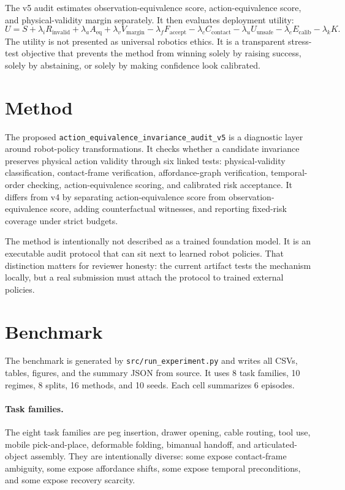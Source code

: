 \documentclass{article}
\begin{document}
The v5 audit estimates observation-equivalence score, action-equivalence score, and physical-validity margin separately. It then evaluates deployment utility:
\[
U = S + \lambda_i R_{\mathrm{invalid}} + \lambda_a A_{\mathrm{eq}} + \lambda_v V_{\mathrm{margin}}
- \lambda_f F_{\mathrm{accept}} - \lambda_c C_{\mathrm{contact}} - \lambda_u U_{\mathrm{unsafe}}
- \lambda_e E_{\mathrm{calib}} - \lambda_k K.
\]
The utility is not presented as universal robotics ethics. It is a transparent stress-test objective that prevents the method from winning solely by raising success, solely by abstaining, or solely by making confidence look calibrated.

\section{Method}
The proposed \texttt{action\_equivalence\_invariance\_audit\_v5} is a diagnostic layer around robot-policy transformations. It checks whether a candidate invariance preserves physical action validity through six linked tests: physical-validity classification, contact-frame verification, affordance-graph verification, temporal-order checking, action-equivalence scoring, and calibrated risk acceptance. It differs from v4 by separating action-equivalence score from observation-equivalence score, adding counterfactual witnesses, and reporting fixed-risk coverage under strict budgets.

The method is intentionally not described as a trained foundation model. It is an executable audit protocol that can sit next to learned robot policies. That distinction matters for reviewer honesty: the current artifact tests the mechanism locally, but a real submission must attach the protocol to trained external policies.

\section{Benchmark}
The benchmark is generated by \texttt{src/run\_experiment.py} and writes all CSVs, tables, figures, and the summary JSON from source. It uses 8 task families, 10 regimes, 8 splits, 16 methods, and 10 seeds. Each cell summarizes 6 episodes.


\paragraph{Task families.} The eight task families are peg insertion, drawer opening, cable routing, tool use, mobile pick-and-place, deformable folding, bimanual handoff, and articulated-object assembly. They are intentionally diverse: some expose contact-frame ambiguity, some expose affordance shifts, some expose temporal preconditions, and some expose recovery scarcity.
\end{document}

